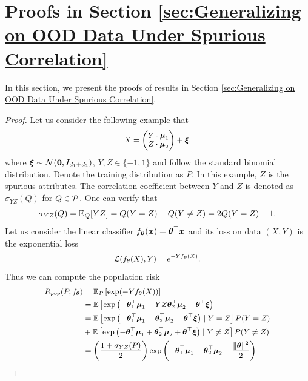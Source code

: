 \section{Proofs in Section \ref{sec:Generalizing on OOD Data Under Spurious Correlation}}\label{app:proofs in sec generalizing}
In this section, we present the proofs of results in Section \ref{sec:Generalizing on OOD Data Under Spurious Correlation}. 
\counterexample*
\begin{proof}
	Let us consider the following example that 
	\begin{equation}\label{eq:data}
		\small
		X = \begin{pmatrix}
			Y\cdot \bmu_{1} \\
			Z\cdot \bmu_{2}
		\end{pmatrix} + \bxi, 
	\end{equation}
	where $\boldsymbol{\xi}\sim\mathcal{N}(\textbf{0}, I_{d_{1}+d_{2}})$, $Y, Z\in\{-1, 1\}$ and follow the standard binomial distribution. Denote the training distribution as $P$. In this example, $Z$ is the spurious attributes. The correlation coefficient between $Y$ and $Z$ is denoted as $\sigma_{YZ}(Q)$ for $Q\in\mathcal{P}$. One can verify that 
	\begin{equation}
		\small
		\sigma_{YZ}(Q) = \mE_{Q}[YZ] = Q(Y = Z) - Q(Y\neq Z) = 2Q(Y = Z) - 1.
	\end{equation}
	Let us consider the linear classifier $f_{\text{\boldmath{$\theta$}}}(\boldsymbol{x}) = \text{\boldmath{$\theta$}}^{\top}\boldsymbol{x}$ and its loss on data $(X, Y)$ is the exponential loss \cite{soudry2018implicit}
	\begin{equation}
		\small
		\cL(f_{\btheta}(X), Y) = e^{-Yf_{\btheta}(X)}.
	\end{equation}
	Thus we can compute the population risk  
	\begin{equation}
		\small
		\begin{aligned}
			R_{pop}(P, f_{\btheta}) & = \mE_{P}\left[\exp(-Yf_{\btheta}(X))\right] \\
			& =  \mE\left[\exp\left(-\btheta_{1}^{\top}\bmu_{1} - YZ\btheta_{2}^{\top}\bmu_{2} - \btheta^{\top}\bxi\right)\right] \\
			& =  \mE\left[\exp\left(-\btheta_{1}^{\top}\bmu_{1} - \btheta_{2}^{\top}\bmu_{2} - \btheta^{\top}\bxi\right)\mid Y = Z\right]P(Y = Z) \\
			& + \mE\left[\exp\left(-\btheta_{1}^{\top}\bmu_{1} + \btheta_{2}^{\top}\bmu_{2} + \btheta^{\top}\bxi\right)\mid Y \neq Z\right]P(Y \neq Z) \\
			& = \left(\frac{1 + \sigma_{YZ}(P)}{2}\right)\exp\left(-\btheta_{1}^{\top}\bmu_{1} - \btheta_{2}^{\top}\bmu_{2} + \frac{\|\btheta\|^{2}}{2}\right) \\

\end{aligned}
\end{equation}
\end{proof}

